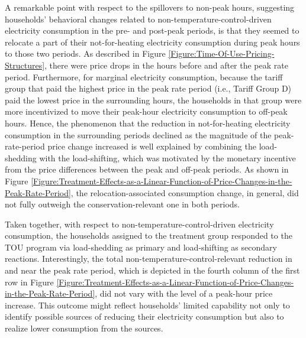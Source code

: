 A remarkable point with respect to the spillovers to non-peak hours, suggesting households' behavioral changes related to non-temperature-control-driven electricity consumption in the pre- and post-peak periods, is that they seemed to relocate a part of their not-for-heating electricity consumption during peak hours to those two periods. As described in Figure \ref{Figure:Time-Of-Use-Pricing-Structures}, there were price drops in the hours before and after the peak rate period. Furthermore, for marginal electricity consumption, because the tariff group that paid the highest price in the peak rate period (i.e., Tariff Group D) paid the lowest price in the surrounding hours, the households in that group were more incentivized to move their peak-hour electricity consumption to off-peak hours. Hence, the phenomenon that the reduction in not-for-heating electricity consumption in the surrounding periods declined as the magnitude of the peak-rate-period price change increased is well explained by combining the load-shedding with the load-shifting, which was motivated by the monetary incentive from the price differences between the peak and off-peak periods. As shown in Figure \ref{Figure:Treatment-Effects-as-a-Linear-Function-of-Price-Changes-in-the-Peak-Rate-Period}, the relocation-associated consumption change, in general, did not fully outweigh the conservation-relevant one in both periods. 

Taken together, with respect to non-temperature-control-driven electricity consumption, the households assigned to the treatment group responded to the TOU program via load-shedding as primary and load-shifting as secondary reactions. Interestingly, the total non-temperature-control-relevant reduction in and near the peak rate period, which is depicted in the fourth column of the first row in Figure \ref{Figure:Treatment-Effects-as-a-Linear-Function-of-Price-Changes-in-the-Peak-Rate-Period}, did not vary with the level of a peak-hour price increase. This outcome might reflect households' limited capability not only to identify possible sources of reducing their electricity consumption but also to realize lower consumption from the sources. 

